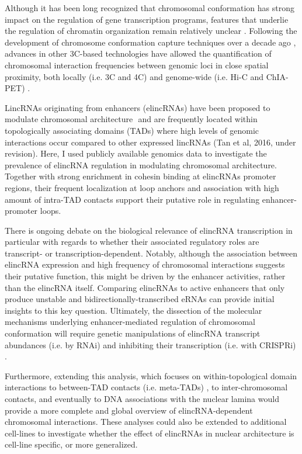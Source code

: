 \documentclass[11pt,a4paper]{report}
\begin{document}
Although it has been long recognized that chromosomal conformation has strong impact on the regulation of gene transcription programs, features that underlie the regulation of chromatin organization remain relatively unclear \cite{Bonev2016}⁠. Following the development of chromosome conformation capture techniques over a decade ago \cite{Dekker2002}⁠, advances in other 3C-based technologies have allowed the quantification of chromosomal interaction frequencies between genomic loci in close spatial proximity, both locally (i.e. 3C and 4C) and genome-wide (i.e. Hi-C and ChIA-PET) \cite{Dekker2013}.

LincRNAs originating from enhancers (elincRNAs) have been proposed to modulate chromosomal architecture \cite{Yin2015}⁠ and are frequently located within topologically associating domains (TADs) where high levels of genomic interactions occur compared to other expressed lincRNAs (Tan et al, 2016, under revision). Here, I used publicly available genomics data to investigate the prevalence of elincRNA regulation in modulating chromosomal architecture. Together with strong enrichment in cohesin binding at elincRNAs promoter regions, their frequent localization at loop anchors and association with high amount of intra-TAD contacts support their putative role in regulating enhancer-promoter loops. 

There is ongoing debate on the biological relevance of elincRNA transcription in particular with regards to  whether their associated regulatory roles are transcript- or transcription-dependent. Notably, although the association between elincRNA expression and high frequency of chromosomal interactions suggests their putative function, this might be driven by the enhancer activities, rather than the elincRNA itself. Comparing elincRNAs to active enhancers that only produce unstable and bidirectionally-transcribed eRNAs can provide initial insights to  this key question. Ultimately, the dissection of the molecular mechanisms underlying enhancer-mediated regulation of chromosomal conformation will require genetic manipulations of elincRNA transcript abundances (i.e. by RNAi) and inhibiting their transcription (i.e. with CRISPRi) \cite{Li2013}⁠.

Furthermore, extending this analysis, which focuses on within-topological domain interactions to between-TAD contacts (i.e. meta-TADs) \cite{Fraser2015}⁠, to inter-chromosomal contacts, and eventually to DNA associations with the nuclear lamina would provide a more complete and global overview of elincRNA-dependent chromosomal interactions. These analyses could also be extended to additional cell-lines to investigate whether the effect of elincRNAs in nuclear architecture is cell-line specific, or more generalized. 
\end{document}
